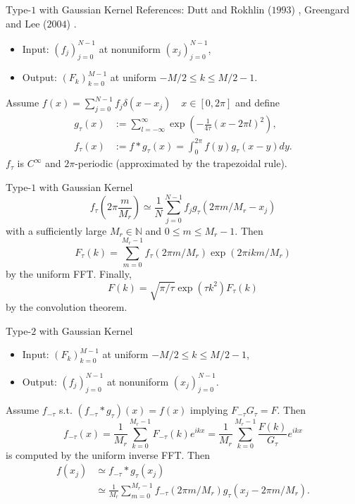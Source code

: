 \documentclass{beamer}
\begin{document}
\begin{frame}{Type-$1$ with Gaussian Kernel}
  References: Dutt and Rokhlin ($1993$) \cite{SISC-1993-Dutt-Rokhlin},
    Greengard and Lee ($2004$) \cite{SIAM-Rev-2004-Greengard}.
  \begin{itemize}
    \item Input: $(f_{j})_{j=0}^{N-1}$ at nonuniform $(x_{j})_{j=0}^{N-1}$,
    \item Output: $(F_{k})_{k=0}^{M-1}$ at uniform $-M/2 \le k \le M/2-1$.
  \end{itemize}
  Assume $f(x) = \sum_{j=0}^{N-1}f_{j}\delta(x - x_{j}) \quad x \in [0,2\pi]$ and define
  \begin{align}
    g_{\tau}(x) &:= \sum_{l=-\infty}^{\infty}\exp\left(-\frac{1}{4\tau}(x-2\pi l)^2\right), \\
    f_{\tau}(x) &:= f\ast g_{\tau} (x)
      = \int_{0}^{2\pi} f(y)g_{\tau}(x-y) dy.
  \end{align}
  $f_{\tau}$ is $C^{\infty}$ and $2\pi$-periodic (approximated by the trapezoidal rule).
\end{frame}

\begin{frame}{Type-$1$ with Gaussian Kernel}
  \begin{equation}
      f_{\tau}(2\pi\frac{m}{M_{r}})
    \simeq \frac{1}{N}\sum_{j=0}^{N-1} f_{j} g_{\tau}(2\pi m/M_{r} - x_{j})
  \end{equation}
  with a sufficiently large $M_{r} \in \mathbb{N}$ and $0 \le m \le M_{r}-1$. Then
  \begin{equation}
    F_{\tau}(k) = \sum_{m=0}^{M_{r}-1}f_{\tau}(2\pi m/M_{r})\exp(2\pi ikm/M_{r})
  \end{equation}
  by the uniform FFT. Finally,
  \begin{equation}
    F(k) = \sqrt{\pi/\tau}\exp(\tau k^2)F_{\tau}(k)
  \end{equation}
  by the convolution theorem.
\end{frame}

\begin{frame}{Type-$2$ with Gaussian Kernel}
  \begin{itemize}
    \item Input: $(F_{k})_{k=0}^{M-1}$ at uniform $-M/2 \le k \le M/2-1$,
    \item Output: $(f_{j})_{j=0}^{N-1}$ at nonuniform $(x_{j})_{j=0}^{N-1}$.
  \end{itemize}
  Assume $f_{-\tau}$ s.t. $(f_{-\tau}\ast g_{\tau})(x) = f(x)$ implying
  $F_{-\tau}G_{\tau} = F$. Then
  \begin{equation}
      f_{-\tau}(x)
    = \frac{1}{M_{r}}\sum_{k=0}^{M_{r}-1} F_{-\tau}(k)e^{ikx}
    = \frac{1}{M_{r}}\sum_{k=0}^{M_{r}-1} \frac{F(k)}{G_{\tau}}e^{ikx}
  \end{equation}
  is computed by the uniform inverse FFT. Then
  \begin{align}
       f(x_{j})
    &\simeq f_{-\tau}\ast g_{\tau}(x_{j}) \\
    &\simeq \frac{1}{M_{r}}\sum_{m=0}^{M_{r}-1}f_{-\tau}(2\pi m/M_{r})g_{\tau}(x_{j} - 2\pi m/M_{r}).
  \end{align}
\end{frame}
\end{document}
